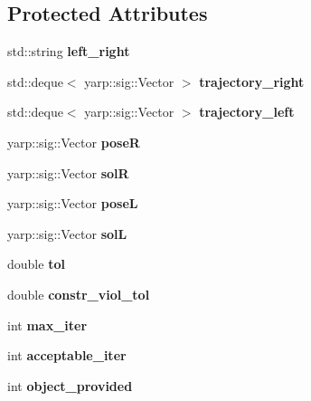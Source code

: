 \subsection*{Protected Attributes}
\begin{DoxyCompactItemize}
\item 
std\+::string {\bfseries left\+\_\+right}\label{classGraspComputation_a7405e0cd57ad3c0ec2757c0d1e6e791a}

\item 
std\+::deque$<$ yarp\+::sig\+::\+Vector $>$ {\bfseries trajectory\+\_\+right}\label{classGraspComputation_ad34b98bdd805de7bbbb92204524fb738}

\item 
std\+::deque$<$ yarp\+::sig\+::\+Vector $>$ {\bfseries trajectory\+\_\+left}\label{classGraspComputation_a72729f4e74e28f866121da7ec56645ee}

\item 
yarp\+::sig\+::\+Vector {\bfseries poseR}\label{classGraspComputation_accdb354cf67e5ea2c2189f33bfd2e802}

\item 
yarp\+::sig\+::\+Vector {\bfseries solR}\label{classGraspComputation_aa8c946727c392c140be73ac1c5e83eb2}

\item 
yarp\+::sig\+::\+Vector {\bfseries poseL}\label{classGraspComputation_a7a265ee7cb25e2617108e7128ae0cce5}

\item 
yarp\+::sig\+::\+Vector {\bfseries solL}\label{classGraspComputation_a0b1a5422bfc7eb04976a8cf4f3a63ed4}

\item 
double {\bfseries tol}\label{classGraspComputation_abeab81e105369cb96aa81154dd6deced}

\item 
double {\bfseries constr\+\_\+viol\+\_\+tol}\label{classGraspComputation_a19511014ec2f0e0e91a4d63dc666955b}

\item 
int {\bfseries max\+\_\+iter}\label{classGraspComputation_ab41a54f337bcd46ecdee9b40a0c964c8}

\item 
int {\bfseries acceptable\+\_\+iter}\label{classGraspComputation_a1c8f00915603a90bd1bb405ea9d49ebd}

\item 
int {\bfseries object\+\_\+provided}\label{classGraspComputation_adf5c4faf99e9e11cdaf8965fb7da91c4}


\end{DoxyCompactItemize}
